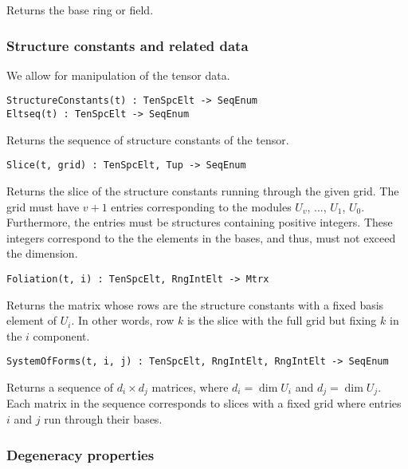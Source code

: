 \documentclass{amsart}
\begin{document}
Returns the base ring or field.

\subsubsection{Structure constants and related data}

We allow for manipulation of the tensor data.

\color{blue}
{\small \begin{verbatim}
StructureConstants(t) : TenSpcElt -> SeqEnum
Eltseq(t) : TenSpcElt -> SeqEnum
\end{verbatim} }
\color{black}

Returns the sequence of structure constants of the tensor. 

\color{blue}
{\small \begin{verbatim}
Slice(t, grid) : TenSpcElt, Tup -> SeqEnum
\end{verbatim} }
\color{black}

Returns the slice of the structure constants running through the given grid. The
grid must have $v+1$ entries corresponding to the modules $U_v$, ..., $U_1$, 
$U_0$. Furthermore, the entries must be structures containing positive integers. 
These integers correspond to the the elements in the bases, and thus, must not
exceed the dimension.

\color{blue}
{\small \begin{verbatim}
Foliation(t, i) : TenSpcElt, RngIntElt -> Mtrx
\end{verbatim} }
\color{black}

Returns the matrix whose rows are the structure constants with a fixed basis 
element of $U_i$. In other words, row $k$ is the slice with the full grid but 
fixing $k$ in the $i$ component.

\color{blue}
{\small \begin{verbatim}
SystemOfForms(t, i, j) : TenSpcElt, RngIntElt, RngIntElt -> SeqEnum
\end{verbatim} }
\color{black}

Returns a sequence of $d_i\times d_j$ matrices, where $d_i=\dim U_i$ and 
$d_j=\dim U_j$. Each matrix in the sequence corresponds to slices with a fixed
grid where entries $i$ and $j$ run through their bases.

\subsubsection{Degeneracy properties}
\end{document}
